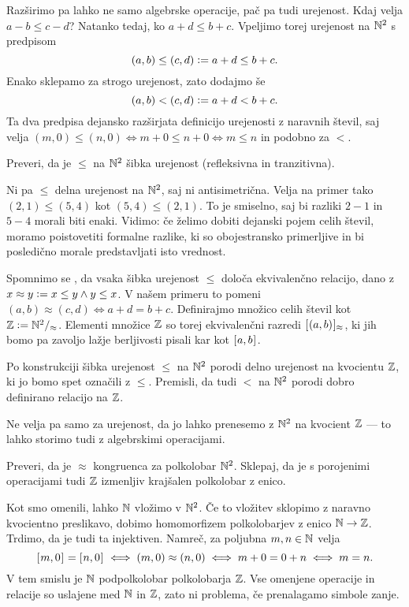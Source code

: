 Razširimo pa lahko ne samo algebrske operacije, pač pa tudi urejenost. Kdaj velja $a - b \leq c - d$? Natanko tedaj, ko $a + d \leq b + c$. Vpeljimo torej urejenost na $\NN^2$ s predpisom
\[(a, b) \leq (c, d) \dfeq a + d \leq b + c.\]
Enako sklepamo za strogo urejenost, zato dodajmo še
\[(a, b) < (c, d) \dfeq a + d < b + c.\]
Ta dva predpisa dejansko razširjata definicijo urejenosti z naravnih števil, saj velja $(m, 0) \leq (n, 0) \iff m + 0 \leq n + 0 \iff m \leq n$ in podobno za $<$.

\begin{naloga}
Preveri, da je $\leq$ na $\NN^2$ šibka urejenost (refleksivna in tranzitivna).
\end{naloga}

Ni pa $\leq$ delna urejenost na $\NN^2$, saj ni antisimetrična. Velja na primer tako $(2, 1) \leq (5, 4)$ kot $(5, 4) \leq (2, 1)$. To je smiselno, saj bi razliki $2 - 1$ in $5 - 4$ morali biti enaki. Vidimo: če želimo dobiti dejanski pojem celih števil, moramo poistovetiti formalne razlike, ki so obojestransko primerljive in bi posledično morale predstavljati isto vrednost.

Spomnimo se , da vsaka šibka urejenost $\leq$ določa ekvivalenčno relacijo, dano z $x \approx y \dfeq x \leq y \land y \leq x$. V našem primeru to pomeni $(a, b) \approx (c, d) \iff a + d = b + c$. Definirajmo množico celih števil kot $\ZZ \dfeq \NN^2/_\approx$. Elementi množice $\ZZ$ so torej ekvivalenčni razredi $\ec[\approx]{(a, b)}$, ki jih bomo pa zavoljo lažje berljivosti pisali kar kot $\ec{a, b}$.

Po konstrukciji šibka urejenost $\leq$ na $\NN^2$ porodi delno urejenost na kvocientu $\ZZ$, ki jo bomo spet označili z $\leq$. Premisli, da tudi $<$ na $\NN^2$ porodi dobro definirano relacijo na $\ZZ$.

Ne velja pa samo za urejenost, da jo lahko prenesemo z $\NN^2$ na kvocient $\ZZ$ --- to lahko storimo tudi z algebrskimi operacijami.
%
\begin{naloga}
Preveri, da je $\approx$ kongruenca za polkolobar $\NN^2$. Sklepaj, da je s porojenimi operacijami tudi $\ZZ$ izmenljiv krajšalen polkolobar z enico.
\end{naloga}

Kot smo omenili, lahko $\NN$ vložimo v $\NN^2$. Če to vložitev sklopimo z naravno kvocientno preslikavo, dobimo homomorfizem polkolobarjev z enico $\NN \to \ZZ$. Trdimo, da je tudi ta injektiven. Namreč, za poljubna $m, n \in \NN$ velja
\[\ec{m, 0} = \ec{n, 0} \iff (m, 0) \approx (n, 0) \iff m + 0 = 0 + n \iff m = n.\]
V tem smislu je $\NN$ podpolkolobar polkolobarja $\ZZ$. Vse omenjene operacije in relacije so uslajene med $\NN$ in $\ZZ$, zato ni problema, če prenalagamo  simbole zanje.

